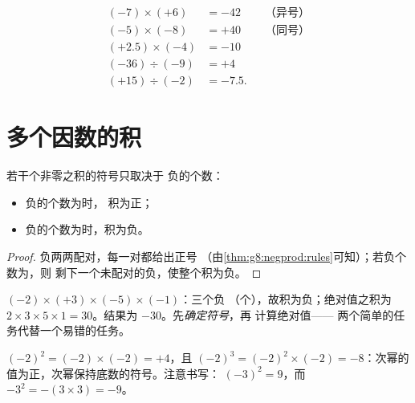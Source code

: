 \begin{example}\label{ex:g8:negprod:products}
\begin{align*}
(-7) \times (+6) &= -42 && \text{（异号）} \\
(-5) \times (-8) &= +40 && \text{（同号）} \\
(+2.5) \times (-4) &= -10 \\
(-36) \div (-9) &= +4 \\
(+15) \div (-2) &= -7.5 .
\end{align*}
\end{example}

\section{多个因数的积}

\begin{proposition}[多个因数之积的符号]\label{prop:g8:negprod:many}
若干个非零之积的符号只取决于
负的个数：
\begin{itemize}
  \item 负的个数为\emph{}时，
        积为正；
  \item 负的个数为\emph{}时，积为负。
\end{itemize}
\end{proposition}

\begin{proof}
负两两配对，每一对都给出正号
（由\cref{thm:g8:negprod:rules}可知）；若负个数为，则
剩下一个未配对的负，使整个积为负。
\end{proof}

\begin{example}\label{ex:g8:negprod:many}
$(-2) \times (+3) \times (-5) \times (-1)$：三个负
（个），故积为负；绝对值之积为 $2 \times 3 \times 5
\times 1 = 30$。结果为 $-30$。先\emph{确定符号}，再
计算绝对值——
两个简单的任务代替一个易错的任务。
\end{example}

\begin{example}[负数的幂]\label{ex:g8:negprod:powers}
$(-2)^2 = (-2) \times (-2) = +4$，且
$(-2)^3 = (-2)^2 \times (-2) = -8$：次幂的
值为正，次幂保持底数的符号。注意书写：
$(-3)^2 = 9$，而 $-3^2 = -(3 \times 3) = -9$。
\end{example}

